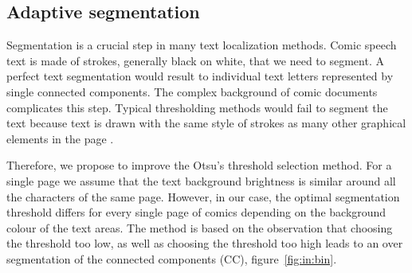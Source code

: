 

\subsection{Adaptive segmentation}
\label{sec:te:segmentation}
Segmentation is a crucial step in many text localization methods.
Comic speech text is made of strokes, generally black on white, that we need to segment.
A perfect text segmentation would result to individual text letters represented by single connected components.
The complex background of comic documents complicates this step.
Typical thresholding methods would fail to segment the text because text is drawn with the same style of strokes as many other graphical elements in the page .

Therefore, we propose to improve the Otsu's threshold selection method. For a single page we assume that the text background brightness is similar around all the characters of the same page. However, in our case, the optimal segmentation threshold differs for every single page of comics depending on the background colour of the text areas. The method is based on the observation that choosing the threshold too low, as well as choosing the threshold too high leads to an over segmentation of the connected components (CC), figure~\ref{fig:in:bin}.

